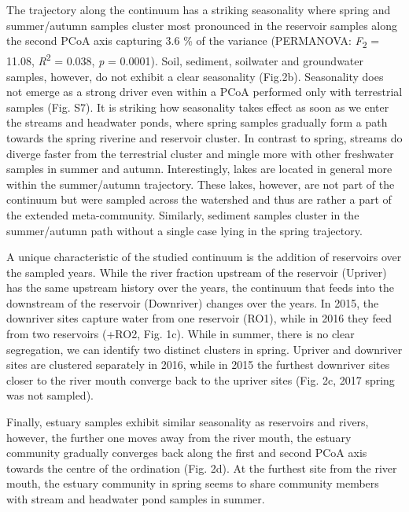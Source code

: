 \documentclass[12pt,a4paper]{article} %
\begin{document}
The trajectory along the continuum has a striking seasonality where spring and summer/autumn samples cluster most pronounced in the reservoir samples along the second PCoA axis capturing 3.6 \% of the variance (PERMANOVA: \textit{F}\textsubscript{2} = 11.08, \textit{R}\textsuperscript{2} = 0.038, \textit{p} = 0.0001). Soil, sediment, soilwater and groundwater samples, however, do not exhibit a clear seasonality (Fig.2b). Seasonality does not emerge as a strong driver even within a PCoA performed only with terrestrial samples (Fig. S7). It is striking how seasonality takes effect as soon as we enter the streams and headwater ponds, where spring samples gradually form a path towards the spring riverine and reservoir cluster. In contrast to spring, streams do diverge faster from the terrestrial cluster and mingle more with other freshwater samples in summer and autumn. Interestingly, lakes are located in general more within the summer/autumn trajectory. These lakes, however, are not part of the continuum but were sampled across the watershed and thus are rather a part of the extended meta-community. Similarly, sediment samples cluster in the summer/autumn path without a single case lying in the spring trajectory.

A unique characteristic of the studied continuum is the addition of reservoirs over the sampled years. While the river fraction upstream of the reservoir (Upriver) has the same upstream history over the years, the continuum that feeds into the downstream of the reservoir (Downriver) changes over the years. In 2015, the downriver sites capture water from one reservoir (RO1), while in 2016 they feed from two reservoirs (+RO2, Fig. 1c). While in summer, there is no clear segregation, we can identify two distinct clusters in spring. Upriver and downriver sites are clustered separately in 2016, while in 2015 the furthest downriver sites closer to the river mouth converge back to the upriver sites (Fig. 2c, 2017 spring was not sampled).

Finally, estuary samples exhibit similar seasonality as reservoirs and rivers, however, the further one moves away from the river mouth, the estuary community gradually converges back along the first and second PCoA axis towards the centre of the ordination (Fig. 2d). At the furthest site from the river mouth, the estuary community in spring seems to share community members with stream and headwater pond samples in summer.
\end{document}
